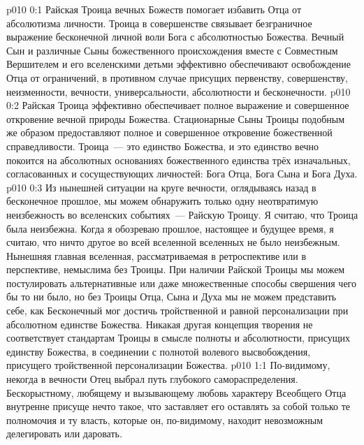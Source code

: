 \author{Всеобщий Цензор}
\vs p010 0:1 Райская Троица вечных Божеств помогает избавить Отца от абсолютизма личности. Троица в совершенстве связывает безграничное выражение бесконечной личной воли Бога с абсолютностью Божества. Вечный Сын и различные Сыны божественного происхождения вместе с Совместным Вершителем и его вселенскими детьми эффективно обеспечивают освобождение Отца от ограничений, в противном случае присущих первенству, совершенству, неизменности, вечности, универсальности, абсолютности и бесконечности.
\vs p010 0:2 Райская Троица эффективно обеспечивает полное выражение и совершенное откровение вечной природы Божества. Стационарные Сыны Троицы подобным же образом предоставляют полное и совершенное откровение божественной справедливости. Троица~--- это единство Божества, и это единство вечно покоится на абсолютных основаниях божественного единства трёх изначальных, согласованных и сосуществующих личностей: Бога Отца, Бога Сына и Бога Духа.
\vs p010 0:3 \pc Из нынешней ситуации на круге вечности, оглядываясь назад в бесконечное прошлое, мы можем обнаружить только одну неотвратимую неизбежность во вселенских событиях~--- Райскую Троицу. Я считаю, что Троица была неизбежна. Когда я обозреваю прошлое, настоящее и будущее время, я считаю, что ничто другое во всей вселенной вселенных не было неизбежным. Нынешняя главная вселенная, рассматриваемая в ретроспективе или в перспективе, немыслима без Троицы. При наличии Райской Троицы мы можем постулировать альтернативные или даже множественные способы свершения чего бы то ни было, но без Троицы Отца, Сына и Духа мы не можем представить себе, как Бесконечный мог достичь тройственной и равной персонализации при абсолютном единстве Божества. Никакая другая концепция творения не соответствует стандартам Троицы в смысле полноты и абсолютности, присущих единству Божества, в соединении с полнотой волевого высвобождения, присущего тройственной персонализации Божества.
\vs p010 1:1 По\hyp{}видимому, некогда в вечности Отец выбрал путь глубокого самораспределения. Бескорыстному, любящему и вызывающему любовь характеру Всеобщего Отца внутренне присуще нечто такое, что заставляет его оставлять за собой только те полномочия и ту власть, которые он, по\hyp{}видимому, находит невозможным делегировать или даровать.
